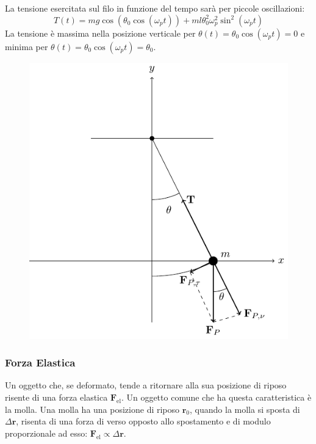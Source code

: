 \documentclass{article}
\newcommand{\vect}[1]{\boldsymbol{\mathbf{#1}}}
\numberwithin{equation}{subsection}
\begin{document}
La tensione esercitata sul filo in funzione del tempo sarà per piccole oscillazioni:
\begin{equation}
    T(t)=mg\cos(\theta_0\cos(\omega_pt))+ml\theta_0^2\omega_p^2\sin^2(\omega_pt)
\end{equation}
La tensione è massima nella posizione verticale per $\theta(t)=\theta_0\cos(\omega_pt)=0$ e minima per $\theta(t)=\theta_0\cos(\omega_pt)=\theta_0$.  

\begin{figure}[H]%
    \centering
    \includegraphics{pendolo-semplice.pdf}%
\end{figure}

\subsubsection{Forza Elastica}
Un oggetto che, se deformato, tende a ritornare alla sua posizione 
di riposo risente di una forza elastica $\vect{F}_{\mathrm{el}}$. Un oggetto 
comune che ha questa caratteristica è la molla. Una molla ha 
una posizione di riposo $\vect{r}_0$, quando la molla si sposta 
di $\Delta\vect{r}$, risenta di una forza di verso opposto allo 
spostamento e di modulo proporzionale ad esso: $\vect{F}_{\mathrm{el}}\propto\Delta\vect{r}$. 
\end{document}
